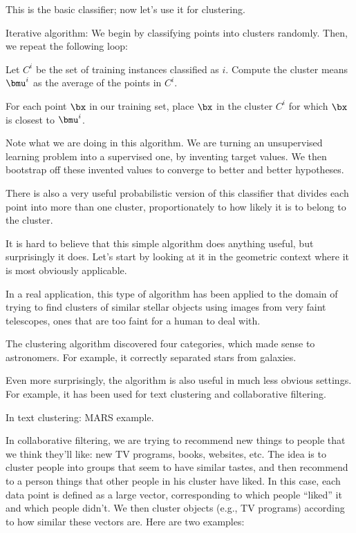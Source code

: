 This is the basic classifier; now let's use it for clustering.

Iterative algorithm:  We begin by classifying points into clusters randomly.
Then, we repeat the following loop: 
\bitem
\item
Let $C^i$ be the set of training instances classified as $i$.  Compute
the cluster means $\bmu^i$ as the average of the points in $C^i$.
\item
For each point $\bx$ in our training set, place $\bx$ in the cluster
$C^i$ for which $\bx$ is closest to $\bmu^i$.
\eitem


Note what we are doing in this algorithm.  We are turning an
unsupervised learning problem into a supervised one, by inventing
target values.  We then bootstrap off these invented values to
converge to better and better hypotheses.  

There is also a very useful probabilistic version of this classifier
that divides each point into more than one cluster, proportionately to
how likely it is to belong to the cluster.

It is hard to believe that this simple algorithm does anything useful, but
surprisingly it does.  Let's start by looking at it in the geometric context
where it is most obviously applicable.


In a real application, this type of algorithm has been applied to the domain
of trying to find clusters of similar stellar objects using images from very
faint telescopes, ones that are too faint for a human to deal with.


The clustering algorithm discovered four categories, which made sense to
astronomers.  For example, it correctly separated stars from galaxies.

Even more surprisingly, the algorithm is also useful in much less obvious
settings.  For example, it has been used for text clustering and 
collaborative filtering. 

In text clustering: MARS example.

In collaborative filtering, we are trying to recommend new things to
people that we think they'll like: new TV programs, books, websites,
etc.  The idea is to cluster people into groups that seem to have
similar tastes, and then recommend to a person things that other
people in his cluster have liked.  In this case, each data point is
defined as a large vector, corresponding to which people ``liked'' it
and which people didn't.  We then cluster objects (e.g., TV programs)
according to how similar these vectors are.  Here are two examples:
  
